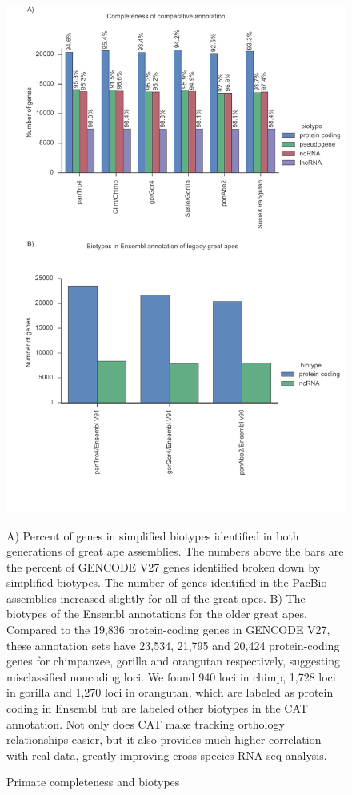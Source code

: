 \begin{figure}
\centering
\includegraphics[scale=0.6]{Supplemental_Figure_S2.pdf}
\caption{Primate completeness and biotypes}
A) Percent of genes in simplified biotypes identified in both generations of great ape assemblies. The numbers above the bars are the percent of GENCODE V27 genes identified broken down by simplified biotypes. The number of genes identified in the PacBio assemblies increased slightly for all of the great apes. B) The biotypes of the Ensembl annotations for the older great apes. Compared to the 19,836 protein-coding genes in GENCODE V27, these annotation sets have 23,534, 21,795 and 20,424 protein-coding genes for chimpanzee, gorilla and orangutan respectively, suggesting misclassified noncoding loci. We found 940 loci in chimp, 1,728 loci in gorilla and 1,270 loci in orangutan, which are labeled as protein coding in Ensembl but are labeled other biotypes in the CAT annotation. Not only does CAT make tracking orthology relationships easier, but it also provides much higher correlation with real data, greatly improving cross-species RNA-seq analysis.
\label{supp_fig:primate_completeness}
\end{figure}

